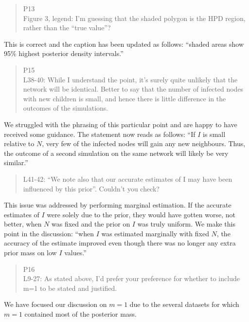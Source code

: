 \documentclass[12pt]{letter}
\begin{document}
\begin{letter}{ }
\begin{quote}
  \itshape

  P13 \\
  Figure 3, legend: I'm guessing that the shaded polygon is the HPD region,
  rather than the ``true value''?
\end{quote}

This is correct and the caption has been updated as follows: ``shaded areas
show 95\% highest posterior density intervals.''

\begin{quote}
  \itshape

  P15 \\
  L38-40: While I understand the point, it's surely quite unlikely that the
  network will be identical. Better to say that the number of infected nodes
  with new children is small, and hence there is little difference in the
  outcomes of the simulations.
\end{quote}

We struggled with the phrasing of this particular point and are happy to have
received some guidance. The statement now reads as follows: ``If $I$ is small
relative to $N$, very few of the infected nodes will gain any new neighbours.
Thus, the outcome of a second simulation on the same network will likely be
very similar.''

\begin{quote}
  \itshape

  L41-42: ``We note also that our accurate estimates of I may have been
  influenced by this prior''. Couldn't you check?
\end{quote}

This issue was addressed by performing marginal estimation. If the accurate
estimates of $I$ were solely due to the prior, they would have gotten worse,
not better, when $N$ was fixed and the prior on $I$ was truly uniform. We make
this point in the discussion: ``when $I$ was estimated marginally with fixed
$N$, the accuracy of the estimate improved even though there was no longer any
extra prior mass on low $I$ values.''

\begin{quote}
  \itshape

  P16 \\
  L9-27: As stated above, I'd prefer your preference for whether to include m=1
  to be stated and justified.
\end{quote}

We have focused our discussion on $m = 1$ due to the several datasets for which
$m = 1$ contained most of the posterior mass.


\end{letter}
\end{document}
